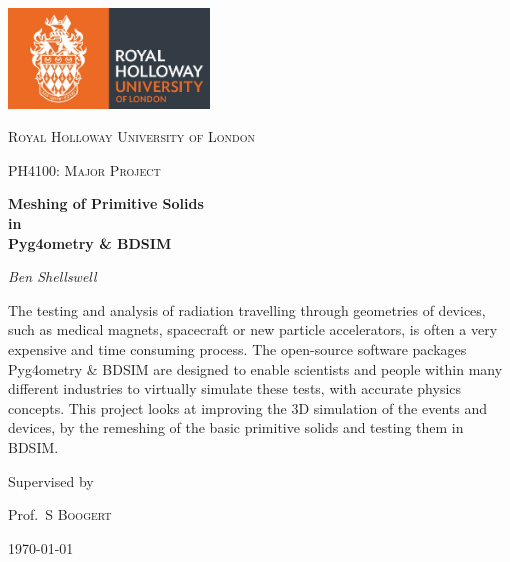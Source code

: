 \documentclass[12pt,a4paper]{article}
\begin{document}
\begin{titlepage}
	\centering
	\includegraphics[width=0.4\textwidth]{Images//Logos//rhul.jpg}\par\vspace{1cm}


	{\scshape\LARGE Royal Holloway University of London \par}
	\vspace{1cm}
	{\scshape\Large PH4100: Major Project\par}
	\vspace{1.5cm}
	{\huge\bfseries Meshing of Primitive Solids\\
	in\\
	Pyg4ometry \& BDSIM\par}
	\vspace{2cm}
	{\Large\itshape Ben Shellswell\par}
	\vfill

\begin{abstract}
\centering

\end{abstract}
The testing and analysis of radiation travelling through geometries of devices, such as medical magnets, spacecraft or new particle accelerators, is often a very expensive and time consuming process. The open-source software packages Pyg4ometry \& BDSIM are designed to enable scientists and people within many different industries to virtually simulate these tests, with accurate physics concepts. This project looks at improving the 3D simulation of the events and devices, by the remeshing of the basic primitive solids and testing them in BDSIM.

	\vfill
	
	Supervised by\par
	Prof.~S \textsc{Boogert} 

	{\large \today\par}




\end{titlepage}
\end{document}
